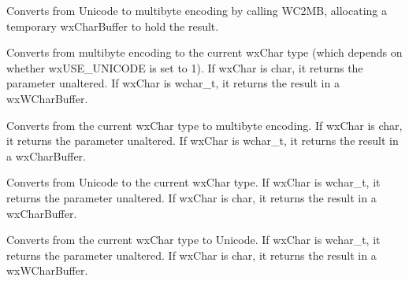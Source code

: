 \label{wxmbconvcwc2mb}


Converts from Unicode to multibyte encoding by calling WC2MB,
allocating a temporary wxCharBuffer to hold the result.

\label{wxmbconvcmb2wx}



Converts from multibyte encoding to the current wxChar type
(which depends on whether wxUSE\_UNICODE is set to 1). If wxChar is char,
it returns the parameter unaltered. If wxChar is wchar\_t, it returns the
result in a wxWCharBuffer.

\label{wxmbconvcwx2mb}



Converts from the current wxChar type to multibyte encoding. If wxChar is char,
it returns the parameter unaltered. If wxChar is wchar\_t, it returns the
result in a wxCharBuffer.

\label{wxmbconvcwc2wx}



Converts from Unicode to the current wxChar type. If wxChar is wchar\_t,
it returns the parameter unaltered. If wxChar is char, it returns the
result in a wxCharBuffer.

\label{wxmbconvcwx2wc}



Converts from the current wxChar type to Unicode. If wxChar is wchar\_t,
it returns the parameter unaltered. If wxChar is char, it returns the
result in a wxWCharBuffer.

